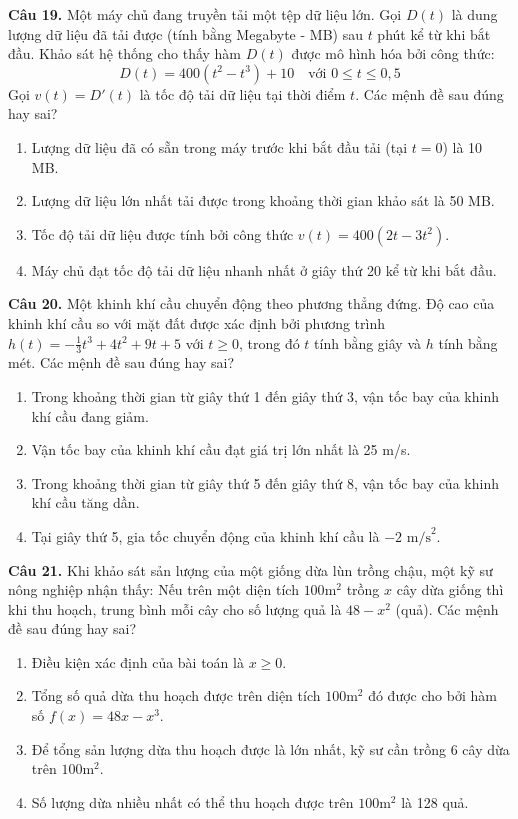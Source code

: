\documentclass[12pt]{article}
\begin{document}
	\noindent \textbf{Câu 19.} Một máy chủ đang truyền tải một tệp dữ liệu lớn. Gọi $D(t)$ là dung lượng dữ liệu đã tải được (tính bằng Megabyte - MB) sau $t$ phút kể từ khi bắt đầu. Khảo sát hệ thống cho thấy hàm $D(t)$ được mô hình hóa bởi công thức:
	\[ D(t) = 400(t^2 - t^3) + 10 \quad \text{với } 0 \le t \le 0,5 \]
	Gọi $v(t) = D'(t)$ là tốc độ tải dữ liệu tại thời điểm $t$. Các mệnh đề sau đúng hay sai?
	\begin{enumerate}[label=\textbf{\alph*)}]
		\item Lượng dữ liệu đã có sẵn trong máy trước khi bắt đầu tải (tại $t=0$) là 10 MB.   
		\item Lượng dữ liệu lớn nhất tải được trong khoảng thời gian khảo sát là 50 MB.   
		\item Tốc độ tải dữ liệu được tính bởi công thức $v(t) = 400(2t - 3t^2)$.   
		\item Máy chủ đạt tốc độ tải dữ liệu nhanh nhất ở giây thứ 20 kể từ khi bắt đầu.   
	\end{enumerate}
	
	\vspace{0.5cm}
	\noindent \textbf{Câu 20.} Một khinh khí cầu chuyển động theo phương thẳng đứng. Độ cao của khinh khí cầu so với mặt đất được xác định bởi phương trình $h(t) = -\frac{1}{3}t^3 + 4t^2 + 9t + 5$ với $t \ge 0$, trong đó $t$ tính bằng giây và $h$ tính bằng mét. Các mệnh đề sau đúng hay sai?
	\begin{enumerate}[label=\textbf{\alph*)}]
		\item Trong khoảng thời gian từ giây thứ 1 đến giây thứ 3, vận tốc bay của khinh khí cầu đang giảm.   
		\item Vận tốc bay của khinh khí cầu đạt giá trị lớn nhất là 25 m/s.   
		\item Trong khoảng thời gian từ giây thứ 5 đến giây thứ 8, vận tốc bay của khinh khí cầu tăng dần.   
		\item Tại giây thứ 5, gia tốc chuyển động của khinh khí cầu là $-2 \text{ m/s}^2$.   
	\end{enumerate}
	
	\vspace{0.5cm}
	\noindent \textbf{Câu 21.} Khi khảo sát sản lượng của một giống dừa lùn trồng chậu, một kỹ sư nông nghiệp nhận thấy: Nếu trên một diện tích $100\text{m}^2$ trồng $x$ cây dừa giống thì khi thu hoạch, trung bình mỗi cây cho số lượng quả là $48 - x^2$ (quả). Các mệnh đề sau đúng hay sai?
	\begin{enumerate}[label=\textbf{\alph*)}]
		\item Điều kiện xác định của bài toán là $x \ge 0$.   
		\item Tổng số quả dừa thu hoạch được trên diện tích $100\text{m}^2$ đó được cho bởi hàm số $f(x) = 48x - x^3$.   
		\item Để tổng sản lượng dừa thu hoạch được là lớn nhất, kỹ sư cần trồng 6 cây dừa trên $100\text{m}^2$.   
		\item Số lượng dừa nhiều nhất có thể thu hoạch được trên $100\text{m}^2$ là 128 quả.   
	\end{enumerate}
	
\end{document}
